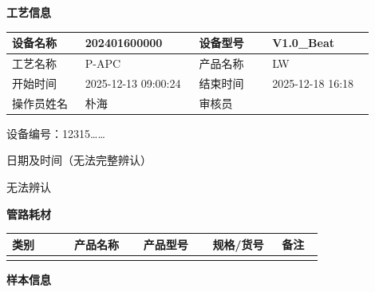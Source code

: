 \documentclass[UTF8,10pt,a4paper,fontset=fandol]{ctexart}
\newcommand{\fieldvalue}[1]{#1}
\newcommand{\handwritten}[1]{#1}
\begin{document}
\noindent
\begin{minipage}[t]{0.47\linewidth}
\small
\textbf{工艺信息}

\begin{tabular}{|p{0.18\linewidth}|p{0.29\linewidth}|p{0.18\linewidth}|p{0.25\linewidth}|}
\hline
设备名称 &
\fieldvalue{202401600000} &
设备型号 &
\fieldvalue{V1.0_Beat}
\\ \hline
工艺名称 &
\fieldvalue{P-APC} &
产品名称 &
\fieldvalue{LW}
\\ \hline
开始时间 &
\fieldvalue{2025-12-13 09:00:24} &
结束时间 &
\fieldvalue{2025-12-18 16:18}
\\ \hline
操作员姓名 &
\fieldvalue{\handwritten{朴海}} &
审核员 &
\\ \hline
\end{tabular}

\vspace{2mm}
\fieldvalue{\handwritten{设备编号：12315……}}

\vspace{1mm}
\fieldvalue{\handwritten{日期及时间（无法完整辨认）}}

\vspace{1mm}
\fieldvalue{\handwritten{无法辨认}}

\textbf{管路耗材}

\begin{tabular}{|p{0.18\linewidth}|p{0.20\linewidth}|p{0.20\linewidth}|p{0.20\linewidth}|p{0.12\linewidth}|}
\hline
类别 & 产品名称 & 产品型号 & 规格\slash 货号 & 备注 \\ \hline
 & & & & \\ \hline
\end{tabular}

\vspace{2mm}
\textbf{样本信息}


\end{minipage}
\end{document}
